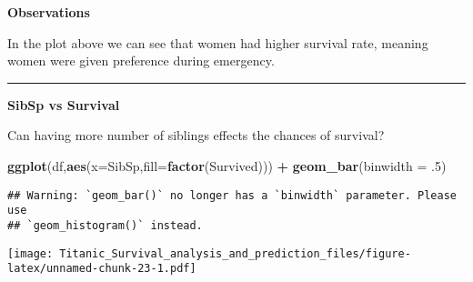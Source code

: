 \documentclass[]{article}
\newenvironment{Shaded}{\begin{snugshade}}{\end{snugshade}}
\newcommand{\KeywordTok}[1]{\textcolor[rgb]{0.13,0.29,0.53}{\textbf{#1}}}
\newcommand{\DataTypeTok}[1]{\textcolor[rgb]{0.13,0.29,0.53}{#1}}
\newcommand{\DecValTok}[1]{\textcolor[rgb]{0.00,0.00,0.81}{#1}}
\newcommand{\StringTok}[1]{\textcolor[rgb]{0.31,0.60,0.02}{#1}}
\newcommand{\OperatorTok}[1]{\textcolor[rgb]{0.81,0.36,0.00}{\textbf{#1}}}
\newcommand{\NormalTok}[1]{#1}
\begin{document}
\textbf{Observations}

In the plot above we can see that women had higher survival rate,
meaning women were given preference during emergency.

\begin{center}\rule{0.5\linewidth}{\linethickness}\end{center}

\textbf{SibSp vs Survival}

Can having more number of siblings effects the chances of survival?

\begin{Shaded}
\begin{Highlighting}[]
\KeywordTok{ggplot}\NormalTok{(df,}\KeywordTok{aes}\NormalTok{(}\DataTypeTok{x=}\NormalTok{SibSp,}\DataTypeTok{fill=}\KeywordTok{factor}\NormalTok{(Survived))) }\OperatorTok{+}\StringTok{ }\KeywordTok{geom_bar}\NormalTok{(}\DataTypeTok{binwidth =}\NormalTok{ .}\DecValTok{5}\NormalTok{)}
\end{Highlighting}
\end{Shaded}

\begin{verbatim}
## Warning: `geom_bar()` no longer has a `binwidth` parameter. Please use
## `geom_histogram()` instead.
\end{verbatim}

\texttt{[image: Titanic\_Survival\_analysis\_and\_prediction\_files/figure-latex/unnamed-chunk-23-1.pdf]}

\begin{Shaded}
\end{Shaded}
\end{document}
